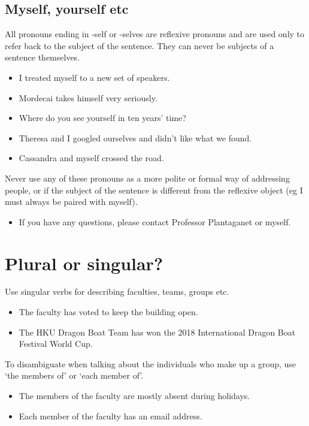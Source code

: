 \documentclass[11pt,a4paper]{book}
\newcommand{\xmark}{{\color{cadmiumred}\ding{54}}}%
\newcommand{\cmark}{{\color{green(html/cssgreen)}\checkmark}}%
\begin{document}
					\subsection{Myself, yourself etc}
					All pronouns ending in -self or -selves are reflexive pronouns and are used only to refer back to the subject of the sentence. They can never be subjects of a sentence themselves.
						{\firasans \begin{mdframed}[backgroundcolor=aliceblue] \begin{itemize}[label=\cmark]
							\item I treated myself to a new set of speakers.
							\item Mordecai takes himself very seriously.
							\item Where do you see yourself in ten years' time?
							\item Theresa and I googled ourselves and didn't like what we found.
							\item[\xmark] Cassandra and myself crossed the road.
						\end{itemize} \end{mdframed} }
					Never use any of these pronouns as a more polite or formal way of addressing people, or if the subject of the sentence is different from the reflexive object (eg I must always be paired with myself).
						{\firasans \begin{mdframed}[backgroundcolor=aliceblue] \begin{itemize}[label=\cmark]
							\item[\xmark] If you have any questions, please contact Professor Plantaganet or myself.
						\end{itemize} \end{mdframed} }
					\section{Plural or singular?}
						Use singular verbs for describing faculties, teams, groups etc.
						{\firasans \begin{mdframed}[backgroundcolor=aliceblue] \begin{itemize}[label=\cmark]
							\item The faculty has voted to keep the building open.
							\item  The HKU Dragon Boat Team has won the 2018 International Dragon Boat Festival World Cup.
						\end{itemize} \end{mdframed} }
						To disambiguate when talking about the individuals who make up a group, use `the members of' or `each member of'.
						{\firasans \begin{mdframed}[backgroundcolor=aliceblue] \begin{itemize}[label=\cmark]
							\item The members of the faculty are mostly absent during holidays.
							\item Each member of the faculty has an email address.
						\end{itemize} \end{mdframed} }
\end{document}
